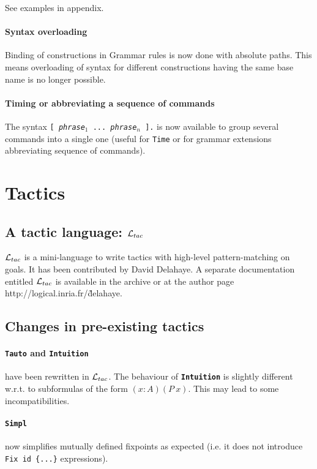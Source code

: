 \documentclass[11pt]{article}
\begin{document}
See examples in appendix.

\paragraph{Syntax overloading}

 Binding of constructions in Grammar rules is now done with absolute
  paths. This means overloading of syntax for different constructions
  having the same base name is no longer possible.

\paragraph{Timing or abbreviating a sequence of commands}

The syntax {\tt [ {\it phrase$_1$} ... {\it phrase$_n$} ].} is now
available to group several commands into a single one (useful for
{\tt Time} or for grammar extensions abbreviating sequence of commands).

\section{Tactics}
\label{Tactics}
\def\ltac{{\cal L}_{tac}}

\subsection{A tactic language: $\ltac$}

$\ltac$ is a mini-language to write tactics with high-level
pattern-matching on goals. It has been contributed by David
Delahaye. A separate documentation entitled $\ltac$ is available in
the archive or at the author page http://logical.inria.fr/\~delahaye.

\subsection{Changes in pre-existing tactics}
\label{TacticChanges}

   \paragraph{{\tt Tauto} and {\bf\tt Intuition}} have been rewritten
   in $\ltac$. The behaviour of {\bf\tt Intuition} is slightly
   different w.r.t. to subformulas of the form $(x:A)(P~x)$. This may
   lead to some incompatibilities.

  \paragraph{{\tt Simpl}} now simplifies mutually defined fixpoints
  as expected (i.e. it does not introduce {\tt Fix id
  \{...\}} expressions).
\end{document}

